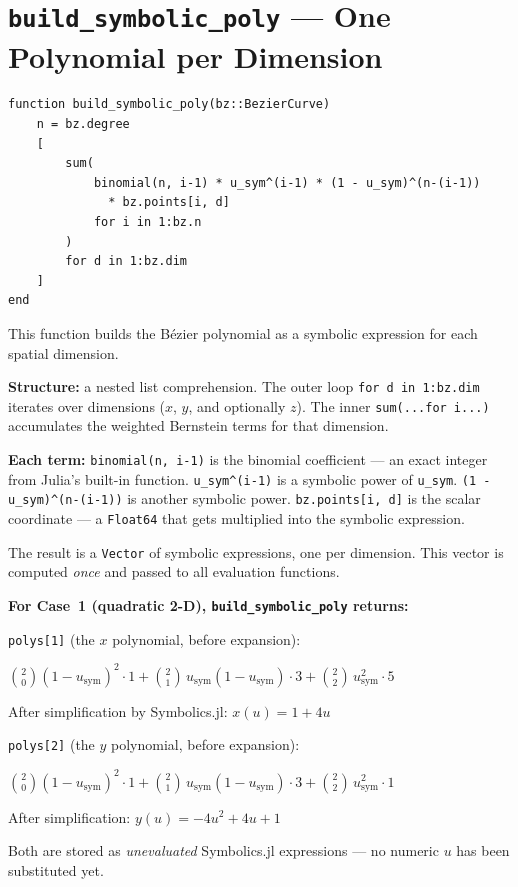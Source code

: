 \documentclass[12pt, a4paper]{article}
\newcommand{\cd}[1]{\texttt{#1}}
\begin{document}
\section{\texttt{build\_symbolic\_poly} --- One Polynomial per Dimension}

\begin{verbatim}
function build_symbolic_poly(bz::BezierCurve)
    n = bz.degree
    [
        sum(
            binomial(n, i-1) * u_sym^(i-1) * (1 - u_sym)^(n-(i-1))
              * bz.points[i, d]
            for i in 1:bz.n
        )
        for d in 1:bz.dim
    ]
end
\end{verbatim}

This function builds the B\'ezier polynomial as a
symbolic expression for each spatial dimension.

\textbf{Structure:} a nested list comprehension.
The outer loop \cd{for d in 1:bz.dim} iterates over
dimensions ($x$, $y$, and optionally $z$).
The inner \cd{sum(...for i...)} accumulates the weighted
Bernstein terms for that dimension.

\textbf{Each term:}
\cd{binomial(n, i-1)} is the binomial coefficient ---
an exact integer from Julia's built-in function.
\cd{u\_sym\^{}(i-1)} is a symbolic power of \cd{u\_sym}.
\cd{(1 - u\_sym)\^{}(n-(i-1))} is another symbolic power.
\cd{bz.points[i, d]} is the scalar coordinate --- a
\cd{Float64} that gets multiplied into the symbolic expression.

The result is a \cd{Vector} of symbolic expressions,
one per dimension.
This vector is computed \emph{once} and passed to all
evaluation functions.

\begin{examplebox}
\textbf{For Case~1 (quadratic 2-D), \cd{build\_symbolic\_poly} returns:}

\medskip
\cd{polys[1]} (the $x$ polynomial, before expansion):

$\binom{2}{0}(1{-}u_\text{sym})^2 \cdot 1
 + \binom{2}{1}\,u_\text{sym}(1{-}u_\text{sym}) \cdot 3
 + \binom{2}{2}\,u_\text{sym}^2 \cdot 5$

After simplification by Symbolics.jl:
$x(u) = 1 + 4u$

\medskip
\cd{polys[2]} (the $y$ polynomial, before expansion):

$\binom{2}{0}(1{-}u_\text{sym})^2 \cdot 1
 + \binom{2}{1}\,u_\text{sym}(1{-}u_\text{sym}) \cdot 3
 + \binom{2}{2}\,u_\text{sym}^2 \cdot 1$

After simplification: $y(u) = -4u^2 + 4u + 1$

\medskip
Both are stored as \emph{unevaluated} Symbolics.jl
expressions --- no numeric $u$ has been substituted yet.
\end{examplebox}
\end{document}
